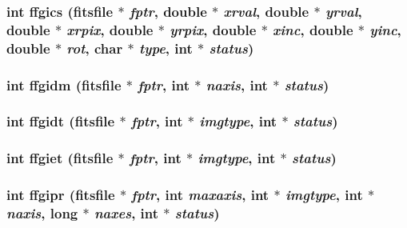 \subsubsection{\setlength{\rightskip}{0pt plus 5cm}int ffgics (\bf{fitsfile} $\ast$ {\em fptr}, double $\ast$ {\em xrval}, double $\ast$ {\em yrval}, double $\ast$ {\em xrpix}, double $\ast$ {\em yrpix}, double $\ast$ {\em xinc}, double $\ast$ {\em yinc}, double $\ast$ {\em rot}, char $\ast$ {\em type}, int $\ast$ {\em status})}\label{test_2roimasker_2fitsio_8h_e41ae6ec4d4f1df61ce26ecc9d558fcb}


\subsubsection{\setlength{\rightskip}{0pt plus 5cm}int ffgidm (\bf{fitsfile} $\ast$ {\em fptr}, int $\ast$ {\em naxis}, int $\ast$ {\em status})}\label{test_2roimasker_2fitsio_8h_2faefcdb1176d17c8159464da5f4fe3f}


\subsubsection{\setlength{\rightskip}{0pt plus 5cm}int ffgidt (\bf{fitsfile} $\ast$ {\em fptr}, int $\ast$ {\em imgtype}, int $\ast$ {\em status})}\label{test_2roimasker_2fitsio_8h_3a8c6b776e15fb6a1ced2ac459366825}


\subsubsection{\setlength{\rightskip}{0pt plus 5cm}int ffgiet (\bf{fitsfile} $\ast$ {\em fptr}, int $\ast$ {\em imgtype}, int $\ast$ {\em status})}\label{test_2roimasker_2fitsio_8h_d26898d66d9521c703b32f967a7ec68c}


\subsubsection{\setlength{\rightskip}{0pt plus 5cm}int ffgipr (\bf{fitsfile} $\ast$ {\em fptr}, int {\em maxaxis}, int $\ast$ {\em imgtype}, int $\ast$ {\em naxis}, long $\ast$ {\em naxes}, int $\ast$ {\em status})}\label{test_2roimasker_2fitsio_8h_36cf874c199041ee45957859c011adc4}


